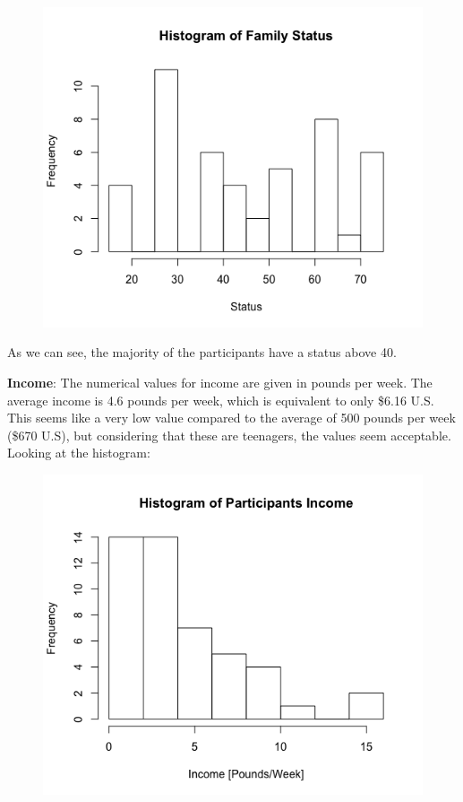 \documentclass{exam}
\begin{document}
	
	\begin{figure}[h]
		\includegraphics[scale=.5]{status}
		\centering
		
	\end{figure}
	As we can see, the majority of the participants have a status above 40. 
	\pagebreak
	
	\noindent
	\textbf{Income}:
	The numerical values for income are given in pounds per week. The average income is 4.6 pounds per week, which is equivalent to only \$6.16 U.S. This seems like a very low value compared to the average of 500 pounds per week (\$670 U.S), but considering that these are teenagers, the values seem acceptable. 
	Looking at the histogram: 
	
	\begin{figure}[h]
		\includegraphics[scale=.5]{income}
		\centering
		
	\end{figure}
	
\end{document}
